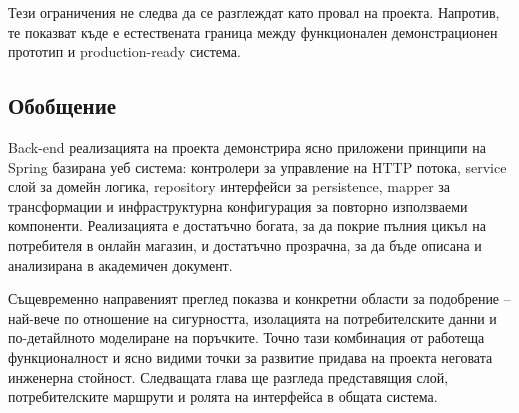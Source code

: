 Тези ограничения не следва да се разглеждат като провал на проекта. Напротив, те показват къде е естествената граница между функционален демонстрационен прототип и production-ready система.

\subsection{Обобщение}

Back-end реализацията на проекта демонстрира ясно приложени принципи на Spring базирана уеб система: контролери за управление на HTTP потока, service слой за домейн логика, repository интерфейси за persistence, mapper за трансформации и инфраструктурна конфигурация за повторно използваеми компоненти. Реализацията е достатъчно богата, за да покрие пълния цикъл на потребителя в онлайн магазин, и достатъчно прозрачна, за да бъде описана и анализирана в академичен документ.

Същевременно направеният преглед показва и конкретни области за подобрение -- най-вече по отношение на сигурността, изолацията на потребителските данни и по-детайлното моделиране на поръчките. Точно тази комбинация от работеща функционалност и ясно видими точки за развитие придава на проекта неговата инженерна стойност. Следващата глава ще разгледа представящия слой, потребителските маршрути и ролята на интерфейса в общата система.
